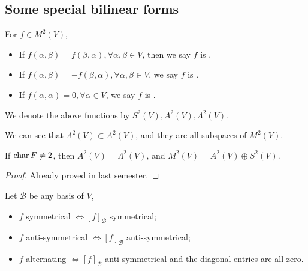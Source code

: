 \subsection{Some special bilinear forms}
\label{sub:Some special bilinear forms}
\begin{definition}
	For $f\in M^2(V)$,
	\begin{itemize}
		\item If $f(\alpha, \beta) = f(\beta, \alpha), \forall \alpha, \beta\in V$,
			then we say $f$ is .
		\item If $f(\alpha, \beta) = -f(\beta,\alpha), \forall \alpha, \beta\in V$,
			we say $f$ is .
		\item If $f(\alpha, \alpha) = 0, \forall \alpha\in V$,
			we say $f$ is .
	\end{itemize}
	We denote the above functions by $S^2(V), A^2(V), \Lambda^2(V)$.
\end{definition}
We can see that $\Lambda^2(V) \subset A^2(V)$,
and they are all subspaces of $M^2(V)$.

\begin{proposition}
	If $\operatorname{char} F\ne 2$, then $A^2(V) = \Lambda^2(V)$,
	and $M^2(V) = A^2(V) \oplus S^2(V)$.
\end{proposition}
\begin{proof}[Proof]
    Already proved in last semester.
\end{proof}

\begin{proposition}
	Let $\mathcal{B}$ be any basis of $V$,
	\begin{itemize}
		\item $f$ symmetrical $\iff [f]_{\mathcal{B}}$ symmetrical;
		\item $f$ anti-symmetrical $\iff [f]_{\mathcal{B}}$ anti-symmetrical;
		\item $f$ alternating $\iff [f]_{\mathcal{B}}$ anti-symmetrical and
			the diagonal entries are all zero.
	\end{itemize}
\end{proposition}
